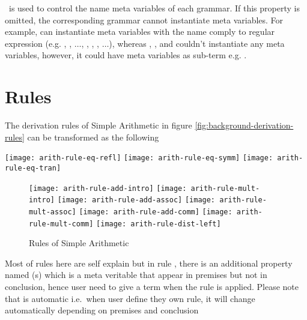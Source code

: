 \documentclass[master.tex]{subfiles}
\begin{document}
\kMetaVarRegex\ is used to control the name meta variables of each grammar. If
this property is omitted, the corresponding grammar cannot instantiate meta
variables. For example,  can instantiate meta variables with the name
comply to regular expression \pregex{\texttt{[a-z][0-9]*}} (e.g. , ,
$\ldots$, , , , $\ldots$), whereas ,
, and  couldn't instantiate any meta variables,
however, it could have meta variables as sub-term e.g. 
.

\section{Rules}

The derivation rules of Simple Arithmetic in figure \ref{fig:background-derivation-rules}
can be transformed as the following

\begin{center}
\begin{minipage}{0.6\textwidth}
    \texttt{[image: arith-rule-eq-refl]}
    \texttt{[image: arith-rule-eq-symm]}
    \texttt{[image: arith-rule-eq-tran]}
\end{minipage}
\end{center}

\begin{figure}[H]
    \centering
\begin{minipage}{0.6\textwidth}
    \texttt{[image: arith-rule-add-intro]}
    \texttt{[image: arith-rule-mult-intro]}
    \texttt{[image: arith-rule-add-assoc]}
    \texttt{[image: arith-rule-mult-assoc]}
    \texttt{[image: arith-rule-add-comm]}
    \texttt{[image: arith-rule-mult-comm]}
    \texttt{[image: arith-rule-dist-left]}
\end{minipage}
    \caption{Rules of Simple Arithmetic}
\label{fig:arith-rules}
\end{figure}

Most of rules here are self explain but in rule , there is an
additional property named \kParameter{}(s) which is a meta veritable that appear
in premises but not in conclusion, hence user need to give a term when the rule
is applied. Please note that \kParameter{} is automatic i.e.\ when user define
they own rule, it will change automatically depending on premises and conclusion
\end{document}
